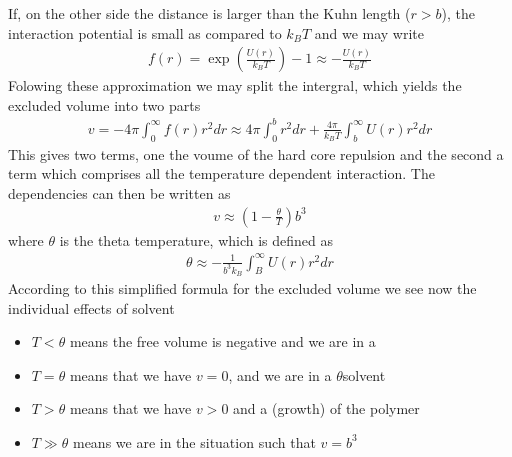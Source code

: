 \documentclass[letterpaper,10pt,english]{sphinxmanual}
\begin{document}
\sphinxAtStartPar
If, on the other side the distance is larger than the Kuhn length (\(r>b\)), the interaction potential is small as compared to \(k_B T\) and we may write
\begin{equation*}
\begin{split}f(r)=\exp\left ( \frac{U(r)}{k_B T}\right)-1 \approx -\frac{U(r)}{k_B T}\end{split}
\end{equation*}
\sphinxAtStartPar
Folowing these approximation we may split the intergral, which yields the excluded volume into two parts
\begin{equation*}
\begin{split}v=-4\pi \int_0^{\infty}f(r)r^2 dr\approx 4\pi \int_0^{b}r^2 dr+\frac{4\pi}{k_B T}\int_b^{\infty}U(r)r^2dr\end{split}
\end{equation*}
\sphinxAtStartPar
This gives two terms, one the voume of the hard core repulsion and the second a term which comprises all the temperature dependent interaction. The dependencies can then be written as
\begin{equation*}
\begin{split}v\approx \left ( 1-\frac{\theta}{T}\right ) b^3\end{split}
\end{equation*}
\sphinxAtStartPar
where \(\theta\) is the theta temperature, which is defined as
\begin{equation*}
\begin{split}\theta\approx -\frac{1}{b^3 k_B}\int_B^{\infty}U(r) r^{2}dr\end{split}
\end{equation*}
\sphinxAtStartPar
According to this simplified formula for the excluded volume we see now the individual effects of solvent
\begin{itemize}
\item {} 
\sphinxAtStartPar
\(T<\theta\) means the free volume is negative and we are in a 

\item {} 
\sphinxAtStartPar
\(T=\theta\) means that we have \(v=0\), and we are in a \(\theta\)\sphinxhyphen{}solvent

\item {} 
\sphinxAtStartPar
\(T>\theta\) means that we have \(v>0\) and a  (growth) of the polymer

\item {} 
\sphinxAtStartPar
\(T\gg\theta\) means we are in the  situation such that \(v=b^{3}\)

\end{itemize}
\end{document}
